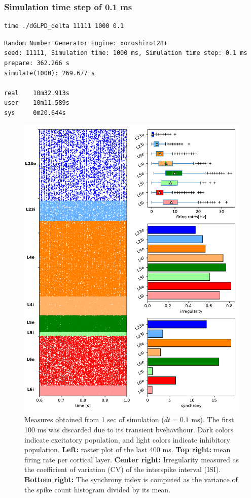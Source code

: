 \documentclass[11pt]{scrartcl}
\begin{document}
\subsubsection{Simulation time step of 0.1 ms}
\label{sec:org6949eb6}

\begin{verbatim}
time ./dGLPD_delta 11111 1000 0.1
\end{verbatim}

\begin{verbatim}
Random Number Generator Engine: xoroshiro128+
seed: 11111, Simulation time: 1000 ms, Simulation time step: 0.1 ms
prepare: 362.266 s
simulate(1000): 269.677 s

real    10m32.913s
user    10m11.589s
sys     0m20.644s
\end{verbatim}

\begin{figure}[htbp]
\centering
\includegraphics[width=.9\linewidth]{./figures/dGLPD_delta_d01_1s.pdf}
\caption[\textbf{Bottom right:}]{\label{fig:org5da79d9}Measures obtained from 1 sec of simulation (\(dt=0.1\) ms). The first 100 ms was discarded due to its transient bvehavihour. Dark colors indicate excitatory population, and light colors indicate inhibitory population. \textbf{Left:} raster plot of the last 400 ms. \textbf{Top right:} mean firing rate per cortical layer. \textbf{Center right:} Irregularity measured as the coefficient of variation (CV) of the interspike interval (ISI). \textbf{Bottom right:} The synchrony index is computed as the variance of the spike count histogram divided by its mean.}
\end{figure}
\end{document}
